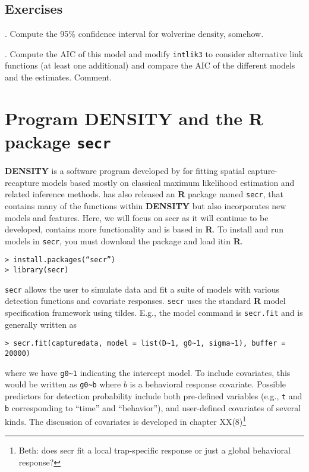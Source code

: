 \subsection{
Exercises
}

{.	Compute the 95\% confidence interval for wolverine density, somehow.
}

{.	Compute the AIC of this model and modify \mbox{\tt intlik3}
 to consider alternative link functions (at least one additional) and
 compare the  AIC of the different models and the estimates. Comment. 
}

\section{Program DENSITY and the R package \mbox{\tt secr} }
\label{mle.sec.secr}


{\bf DENSITY} is a software program developed by \citet{efford:2004}
for 
fitting spatial capture-recapture models based mostly on classical
maximum likelihood estimation and related inference methods.  \citet{efford:2011}
has also released an {\bf R} package named \mbox{\tt secr}, that contains many
of the functions within {\bf DENSITY} but also incorporates new models and
features.  Here, we will focus on secr as it will continue to be
developed, contains more functionality and is based in {\bf R}.  To install
and run models in \mbox{\tt secr}, you must download the package and load itin
{\bf R}.
\begin{verbatim}
> install.packages(“secr”)
> library(secr)
\end{verbatim}
\mbox{\tt secr} allows the user to simulate data and fit a suite of models with
various detection functions and covariate responses.  \mbox{\tt secr}
uses the
standard {\bf R} model specification framework using tildes. E.g., the model
command is \mbox{\tt secr.fit} and is generally written as
\begin{verbatim}
> secr.fit(capturedata, model = list(D~1, g0~1, sigma~1), buffer = 20000)
\end{verbatim}
where we have \verb#g0~1# indicating the intercept model.  To include
covariates, this would be written as \verb#g0~b# where $b$ is a
behavioral
response 
covariate.  Possible predictors for detection probability include both
pre-defined variables (e.g., \mbox{\tt t} and \mbox{\tt b}
corresponding to ``time'' and 
``behavior''), and user-defined covariates of several kinds. The
discussion of covariates is developed in chapter XX(8)\footnote{Beth:
  does secr fit a local trap-specific response or just a global
  behavioral response?}


